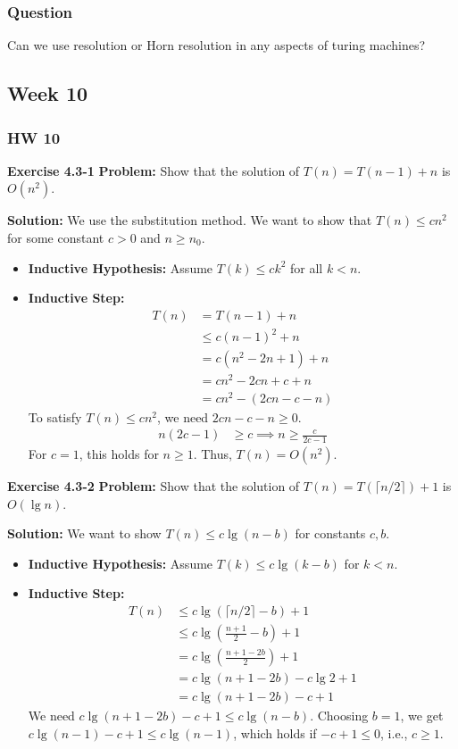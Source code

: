 \documentclass{article}
\theoremstyle{theorem}
\theoremstyle{definition}
\theoremstyle{remark}
\begin{document}
\subsubsection{Question}
Can we use resolution or Horn resolution in any aspects of turing machines?

\subsection{Week 10}

\subsubsection{HW 10}

\textbf{Exercise 4.3-1}
\textbf{Problem:} Show that the solution of $T(n) = T(n-1) + n$ is $O(n^2)$.

\textbf{Solution:}
We use the substitution method. We want to show that $T(n) \leq cn^2$ for some constant $c > 0$ and $n \geq n_0$.
\begin{itemize}
    \item \textbf{Inductive Hypothesis:} Assume $T(k) \leq ck^2$ for all $k < n$.
    \item \textbf{Inductive Step:}
    \begin{align*}
    T(n) &= T(n-1) + n \\
    &\leq c(n-1)^2 + n \\
    &= c(n^2 - 2n + 1) + n \\
    &= cn^2 - 2cn + c + n \\
    &= cn^2 - (2cn - c - n)
    \end{align*}
    To satisfy $T(n) \leq cn^2$, we need $2cn - c - n \geq 0$.
    \begin{align*}
    n(2c - 1) &\geq c \implies n \geq \frac{c}{2c - 1}
    \end{align*}
    For $c=1$, this holds for $n \geq 1$. Thus, $T(n) = O(n^2)$.
\end{itemize}

\textbf{Exercise 4.3-2}
\textbf{Problem:} Show that the solution of $T(n) = T(\lceil n/2 \rceil) + 1$ is $O(\lg n)$.

\textbf{Solution:}
We want to show $T(n) \leq c \lg(n - b)$ for constants $c, b$.
\begin{itemize}
    \item \textbf{Inductive Hypothesis:} Assume $T(k) \leq c \lg(k - b)$ for $k < n$.
    \item \textbf{Inductive Step:}
    \begin{align*}
    T(n) &\leq c \lg(\lceil n/2 \rceil - b) + 1 \\
    &\leq c \lg\left(\frac{n+1}{2} - b\right) + 1 \\
    &= c \lg\left(\frac{n + 1 - 2b}{2}\right) + 1 \\
    &= c \lg(n + 1 - 2b) - c \lg 2 + 1 \\
    &= c \lg(n + 1 - 2b) - c + 1
    \end{align*}
    We need $c \lg(n + 1 - 2b) - c + 1 \leq c \lg(n - b)$. 
    Choosing $b=1$, we get $c \lg(n - 1) - c + 1 \leq c \lg(n - 1)$, which holds if $-c + 1 \leq 0$, i.e., $c \geq 1$.
\end{itemize}
\end{document}
